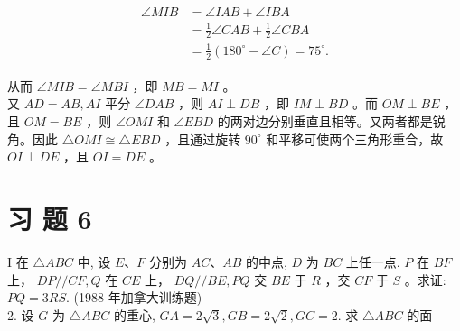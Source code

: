 \documentclass[10pt]{article}
\begin{document}
\begin{align*}
\begin{aligned}
\angle M I B & =\angle I A B+\angle I B A \\
& =\frac{1}{2} \angle C A B+\frac{1}{2} \angle C B A \\
& =\frac{1}{2}\left(180^{\circ}-\angle C\right)=75^{\circ} .
\end{aligned}
\end{align*}

从而 $\angle M I B=\angle M B I$ ，即 $M B=M I$ 。\\
又 $A D=A B, A I$ 平分 $\angle D A B$ ，则 $A I \perp D B$ ，即 $I M \perp B D$ 。而 $O M \perp B E$ ，且 $O M=B E$ ，则 $\angle O M I$ 和 $\angle E B D$ 的两对边分别垂直且相等。又两者都是锐角。因此 $\triangle O M I \cong \triangle E B D$ ，且通过旋转 $90^{\circ}$ 和平移可使两个三角形重合，故 $O I \perp D E$ ，且 $O I=D E$ 。

\section*{习 题 6}
I 在 $\triangle A B C$ 中, 设 $E 、 F$ 分别为 $A C 、 A B$ 的中点, $D$ 为 $B C$ 上任一点. $P$ 在 $B F$ 上， $D P / / C F, Q$ 在 $C E$ 上， $D Q / / B E, P Q$ 交 $B E$ 于 $R$ ，交 $C F$ 于 $S$ 。求证: $P Q=3 R S$. (1988 年加拿大训练题)\\
2. 设 $G$ 为 $\triangle A B C$ 的重心, $G A=2 \sqrt{3}, G B=2 \sqrt{2}, G C=2$. 求 $\triangle A B C$ 的面
\end{document}
